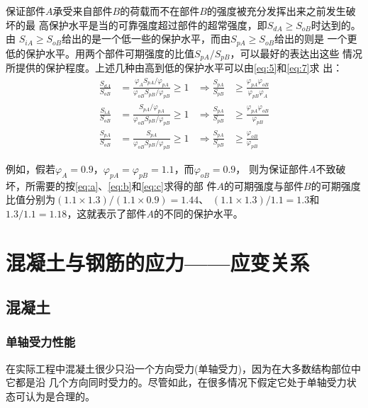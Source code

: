\documentclass[12pt,a4paper]{book}
\begin{document}
保证部件$A$承受来自部件$B$的荷载而不在部件$B$的强度被充分发挥出来之前发生破坏的最
高保护水平是当的可靠强度超过部件的超常强度，即$S_{dA}\ge S_{oB}$时达到的。由
$S_{iA}\ge S_{oB}$给出的是一个低一些的保护水平，而由$S_{pA}\ge S_{oB}$给出的则是
一个更低的保护水平。用两个部件可期强度的比值$S_{pA}/S_{pB}$，可以最好的表达出这些
情况所提供的保护程度。上述几种由高到低的保护水平可以由\cref{eq:5}和\cref{eq:7}求
出：
\begin{subequations}
  \begin{align} \frac{S_{dA}}{S_{oB}} &= \frac{\varphi_A
S_{pA}/\varphi_{pA}}{\varphi_{oB} S_{pB}/\varphi_{pB}}\ge 1&
\Rightarrow\frac{S_{pA}}{S_{pB}} &\ge \frac{\varphi_{pA}
\varphi_{oB}}{\varphi_{pB} \varphi_{A}}\label{eq:a}\\ 
\frac{S_{iA}}{S_{oB}} &=
\frac{S_{pA}/\varphi_{pA}}{\varphi_{oB} S_{pB}/\varphi_{pB}}\ge 1 &
\Rightarrow\frac{S_{pA}}{S_{pB}} &\ge \frac{\varphi_{pA}
\varphi_{oB}}{\varphi_{pB}}\label{eq:b}\\ 
\frac{S_{pA}}{S_{oB}} &=
\frac{S_{pA}}{\varphi_{oB} S_{pB}/\varphi_{pB}}\ge 1 &
\Rightarrow\frac{S_{pA}}{S_{pB}} &\ge
\frac{\varphi_{oB}}{\varphi_{pB}}\label{eq:c}
  \end{align}
\end{subequations}

例如，假若$\varphi_A=0.9$，$\varphi_{pA}=\varphi_{pB}=1.1$，而$\varphi_{oB}=0.9$，
则为保证部件$A$不致破坏，所需要的按\cref{eq:a}、\cref{eq:b}和\cref{eq:c}求得的部
件$A$的可期强度与部件$B$的可期强度比值分别为$(1.1\times1.3)/(1.1\times0.9)=1.44$、
$(1.1\times1.3)/1.1=1.3$和$1.3/1.1=1.18$，这就表示了部件$A$的不同的保护水平。

\chapter{混凝土与钢筋的应力——应变关系}

\section{混凝土} 

\subsection{单轴受力性能}

在实际工程中混凝土很少只沿一个方向受力(单轴受力)，因为在大多数结构部位中它都是沿
几个方向同时受力的。尽管如此，在很多情况下假定它处于单轴受力状态可认为是合理的。
\end{document}
